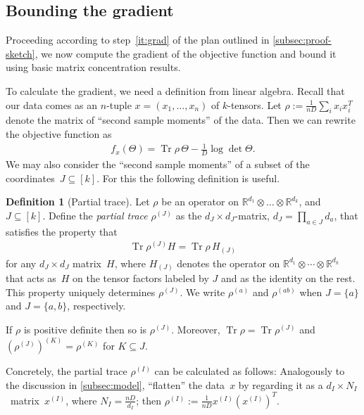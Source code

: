 \documentclass[aos]{imsart}
\theoremstyle{definition}
\newtheorem*{definition}{Definition}
\numberwithin{equation}{section}
\DeclareMathOperator{\tr}{Tr}
\newcommand{\R}{{\mathbb{R}}}
\newcommand{\ot}{\otimes}
\begin{document}
\subsection{Bounding the gradient}
Proceeding according to step~\ref{it:grad} of the plan outlined in \cref{subsec:proof-sketch}, we now compute the gradient of the objective function and bound it using basic matrix concentration results.

To calculate the gradient, we need a definition from linear algebra.
Recall that our data comes as an $n$-tuple $x=(x_1,\dots,x_n)$ of $k$-tensors. %
Let $\rho := \frac1{nD}\sum_i x_i x_i^T$ denote the matrix of ``second sample moments'' of the data.
Then we can rewrite the objective function as
\begin{align}\label{eq:obj via rho}
  f_x(\Theta) = \tr \rho \, \Theta - \frac1D \log \det \Theta.
\end{align}
We may also consider the ``second sample moments'' of a subset of the coordinates~$J \subseteq [k]$.
For this the following definition is useful.

\begin{definition}[Partial trace]\label{definition:partial-trace}
Let $\rho$ be an operator on $\R^{d_1} \ot \dots \ot \R^{d_k}$, and~$J \subseteq [k]$.
Define the \emph{partial trace} $\rho^{(J)}$ as the $d_J \times d_J$-matrix, $d_J = \prod_{a\in J} d_a$, that satisfies the property that
\begin{align}\label{eq:partial trace duality}
  \tr \rho^{(J)} H
= \tr \rho \, H_{(J)}
\end{align}
for any $d_J\times d_J$ matrix~$H$, where $H_{(J)}$ denotes the operator on $\R^{d_1} \ot \cdots \ot \R^{d_k}$ that acts as~$H$ on the tensor factors labeled by $J$ and as the identity on the rest.
This property uniquely determines $\rho^{(J)}$.
We write $\rho^{(a)}$ and $\rho^{(ab)}$ when $J=\{a\}$ and $J=\{a,b\}$, respectively.


If $\rho$ is positive definite then so is $\rho^{(J)}$.
Moreover, $\tr \rho = \tr \rho^{(J)}$ and $(\rho^{(J)})^{(K)} = \rho^{(K)}$ for $K \subseteq J$.
\end{definition}

Concretely, the partial trace $\rho^{(I)}$ can be calculated as follows:
Analogously to the discussion in \cref{subsec:model}, ``flatten'' the data~$x$ by regarding it as a $d_I \times N_I$~matrix~$x^{(I)}$, where $N_I = \frac{nD}{d_I}$;
then $\rho^{(I)} := \frac1{nD} x^{(I)} (x^{(I)})^T$.
\end{document}

